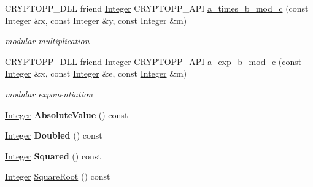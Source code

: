  \begin{DoxyCompactItemize}
\item 
\hypertarget{class_integer_ade2ec2513a3d2cd2f2ca77204ecfc2cb}{
CRYPTOPP\_\-DLL friend \hyperlink{class_integer}{Integer} CRYPTOPP\_\-API \hyperlink{class_integer_ade2ec2513a3d2cd2f2ca77204ecfc2cb}{a\_\-times\_\-b\_\-mod\_\-c} (const \hyperlink{class_integer}{Integer} \&x, const \hyperlink{class_integer}{Integer} \&y, const \hyperlink{class_integer}{Integer} \&m)}
\label{class_integer_ade2ec2513a3d2cd2f2ca77204ecfc2cb}

\begin{DoxyCompactList}\small\item\em modular multiplication \item\end{DoxyCompactList}\item 
\hypertarget{class_integer_a3b3f94c11fbf120d78837483093dfc8b}{
CRYPTOPP\_\-DLL friend \hyperlink{class_integer}{Integer} CRYPTOPP\_\-API \hyperlink{class_integer_a3b3f94c11fbf120d78837483093dfc8b}{a\_\-exp\_\-b\_\-mod\_\-c} (const \hyperlink{class_integer}{Integer} \&x, const \hyperlink{class_integer}{Integer} \&e, const \hyperlink{class_integer}{Integer} \&m)}
\label{class_integer_a3b3f94c11fbf120d78837483093dfc8b}

\begin{DoxyCompactList}\small\item\em modular exponentiation \item\end{DoxyCompactList}\item 
\hypertarget{class_integer_a3561a8987c0150e20d2fe0f7ef44c70b}{
\hyperlink{class_integer}{Integer} {\bfseries AbsoluteValue} () const }
\label{class_integer_a3561a8987c0150e20d2fe0f7ef44c70b}

\item 
\hypertarget{class_integer_a5e1a3170987a46b3682e217057687c2b}{
\hyperlink{class_integer}{Integer} {\bfseries Doubled} () const }
\label{class_integer_a5e1a3170987a46b3682e217057687c2b}

\item 
\hypertarget{class_integer_ae0b94a015187c923d4e36683c8cb0668}{
\hyperlink{class_integer}{Integer} {\bfseries Squared} () const }
\label{class_integer_ae0b94a015187c923d4e36683c8cb0668}

\item 
\hypertarget{class_integer_a9cbc1009bb421942470163aed5e3fefb}{
\hyperlink{class_integer}{Integer} \hyperlink{class_integer_a9cbc1009bb421942470163aed5e3fefb}{SquareRoot} () const }
\label{class_integer_a9cbc1009bb421942470163aed5e3fefb}


\end{DoxyCompactItemize}
